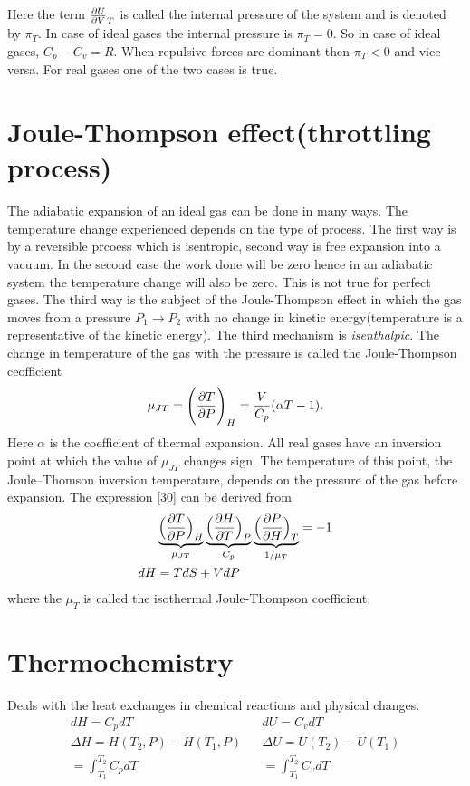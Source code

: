 \documentclass[12pt]{article}
\begin{document}
Here the term $\pdv{U}{V}_T$ is called the internal pressure of the system and is denoted by $\pi_T$. In case of ideal gases the internal pressure is $\pi_T=0$. So in case of ideal gases, $C_p-C_v=R$. When repulsive forces are dominant then $\pi_T<0$ and vice versa. For real gases one of the two cases is true.

\section{Joule-Thompson effect(throttling process)}
The adiabatic expansion of an ideal gas can be done in many ways. The temperature change experienced depends on the type of process. The first way is by a reversible prcoess which is isentropic, second way is free expansion into a vacuum. In the second case the work done will be zero hence in an adiabatic system the temperature change will also be zero. This is not true for perfect gases. The third way is the subject of the Joule-Thompson effect in which the gas moves from a pressure $P_1\to P_2$ with no change in kinetic energy(temperature is a representative of the kinetic energy). The third mechanism is \textit{isenthalpic}. The change in temperature of the gas with the pressure is called the Joule-Thompson ceofficient
\begin{equation}
	\mu_{JT}=\Bigg(\pdv{T}{P}\Bigg)_H=\frac{V}{C_p}(\alpha T-1). \label{30}
\end{equation} 
Here $\alpha$ is the coefficient of thermal expansion. All real gases have an inversion point at which the value of $\mu_{JT}$ changes sign. The temperature of this point, the Joule–Thomson inversion temperature, depends on the pressure of the gas before expansion. The expression \eqref{30} can be derived from
\begin{align}
                &	  \underbrace{\Big(\pdv{T}{P}\Big)_H}_{\mu_{JT}} \underbrace{\Big(\pdv{H}{T}\Big)_P}_{C_p} \underbrace{\Big(\pdv{P}{H}\Big)_T}_{1/\mu_{T}}=-1\\
              dH&=TdS+VdP
\end{align} 
where the $\mu_{T}$ is called the isothermal Joule-Thompson coefficient. 

\section{Thermochemistry}

Deals with the heat exchanges in chemical reactions and physical changes. 
\begin{align}
	dH=C_pdT && dU=C_vdT\\
\Delta H=H(T_2,P)-H(T_1,P) && \Delta U=U(T_2)-U(T_1)\\
        =\int_{T_1}^{T_2}C_pdT && =\int_{T_1}^{T_2}C_vdT
\end{align}
\end{document}
